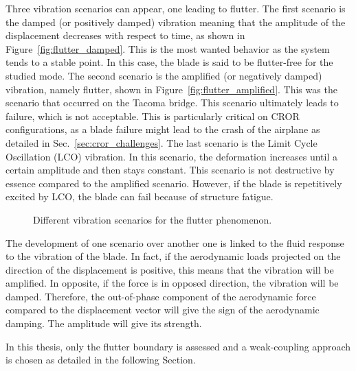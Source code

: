 Three vibration scenarios can appear, one leading to flutter.
The first scenario is the damped (or positively damped) 
vibration meaning
that the amplitude of the displacement decreases with respect to time, 
as shown in Figure~\ref{fig:flutter_damped}.
This is the most wanted behavior as the system tends to
a stable point. In this case, the blade is said to
be flutter-free for the studied mode.
The second scenario is the amplified (or negatively damped)
vibration, namely flutter, shown in Figure~\ref{fig:flutter_amplified}. 
This was the scenario that occurred on the Tacoma bridge. 
This scenario ultimately
leads to failure, which is not acceptable. This is particularly critical
on CROR configurations, as a blade failure might lead to 
the crash of the airplane as detailed in Sec.~\ref{sec:cror_challenges}.
The last scenario is the Limit Cycle Oscillation (LCO) vibration.
In this scenario, the deformation increases until a certain 
amplitude and then stays constant. This scenario is not
destructive by essence compared to the amplified scenario. However,
if the blade is repetitively excited by LCO, the blade
can fail because of structure fatigue.
\begin{figure}[htp]
  \centering
  \caption{Different vibration scenarios for the flutter phenomenon.}
\end{figure}

The development of one scenario over another one is linked to
the fluid response to the vibration of the blade. In fact,
if the aerodynamic loads projected on the direction of the displacement
is positive, this means that the vibration will be amplified. 
In opposite, if the force is in opposed direction, the vibration will be damped.
Therefore, the out-of-phase component of the aerodynamic force compared to
the displacement vector will give the sign of the aerodynamic damping.
The amplitude will give its strength. 

In this thesis, only the flutter boundary is assessed
and a weak-coupling approach is chosen
as detailed in the following Section.
